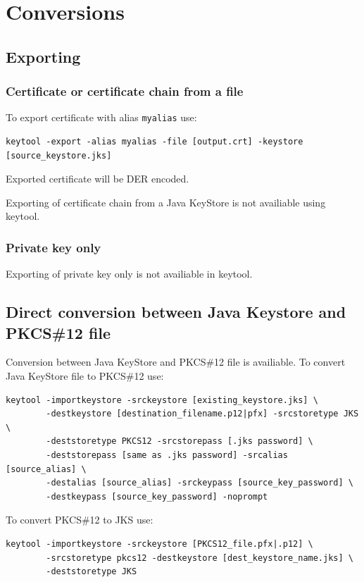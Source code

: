 \documentclass[10pt, a4paper]{report}
\begin{document}
\section{Conversions}

  \subsection{Exporting}
  
    \subsubsection{Certificate or certificate chain from a file}
To export certificate with alias \verb+myalias+ use:
\begin{verbatim}
keytool -export -alias myalias -file [output.crt] -keystore [source_keystore.jks]
\end{verbatim}  
Exported certificate will be DER encoded.

Exporting of certificate chain from a Java KeyStore is not availiable using keytool.

    \subsubsection{Private key only}
Exporting of private key only is not availiable in keytool.

  \subsection{Direct conversion between Java Keystore and PKCS\#12 file}
Conversion between Java KeyStore and PKCS\#12 file is availiable. To convert Java KeyStore file to PKCS\#12 use:
\begin{verbatim}
keytool -importkeystore -srckeystore [existing_keystore.jks] \
        -destkeystore [destination_filename.p12|pfx] -srcstoretype JKS \
        -deststoretype PKCS12 -srcstorepass [.jks password] \
        -deststorepass [same as .jks password] -srcalias [source_alias] \
        -destalias [source_alias] -srckeypass [source_key_password] \
        -destkeypass [source_key_password] -noprompt
\end{verbatim}

To convert PKCS\#12 to JKS use:
\begin{verbatim}
keytool -importkeystore -srckeystore [PKCS12_file.pfx|.p12] \
        -srcstoretype pkcs12 -destkeystore [dest_keystore_name.jks] \
        -deststoretype JKS
\end{verbatim}
\end{document}
